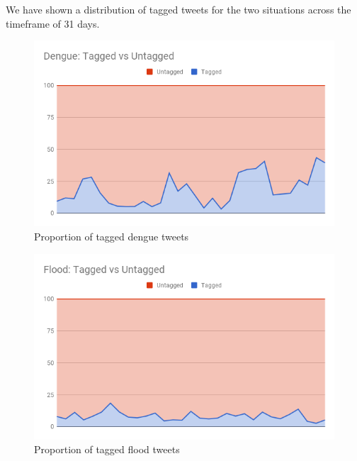 \documentclass[journal, a4paper]{IEEEtran}
\begin{document}
We have shown a distribution of tagged tweets for the two situations across the timeframe of 31 days.

\begin{figure}[h]
		\begin{center}
			\includegraphics[scale=0.35]{dengue_daily}
			\caption{Proportion of tagged dengue tweets}
			\label{fig:tf_plot}
		\end{center}
\end{figure}
\begin{figure}[h]
	\begin{center}
		\includegraphics[scale=0.35]{flood_daily}
		\caption{Proportion of tagged flood tweets}
		\label{fig:tf_plot2}
	\end{center}
\end{figure}
 
\end{document}
